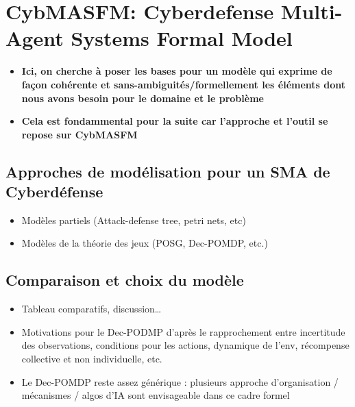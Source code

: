 \chapter{CybMASFM: Cyberdefense Multi-Agent Systems Formal Model}\label{ch:cybmasfm} %

\begin{itemize}
    \item \textbf{Ici, on cherche à poser les bases pour un modèle qui exprime de façon cohérente et sans-ambiguités/formellement les éléments dont nous avons besoin pour le domaine et le problème}
    \item \textbf{Cela est fondammental pour la suite car l'approche et l'outil se repose sur CybMASFM}
\end{itemize}

\section{Approches de modélisation pour un SMA de Cyberdéfense}
\begin{itemize}

    \item Modèles partiels (Attack-defense tree, petri nets, etc)
    \item Modèles de la théorie des jeux (POSG, Dec-POMDP, etc.)
\end{itemize}

\section{Comparaison et choix du modèle}
\begin{itemize}

    \item Tableau comparatifs, discussion…
    \item Motivations pour le Dec-PODMP d’après le rapprochement entre incertitude des observations, conditions pour les actions, dynamique de l’env, récompense collective et non individuelle, etc.
    \item Le Dec-POMDP reste assez générique : plusieurs approche d’organisation / mécanismes / algos d’IA sont envisageable dans ce cadre formel
\end{itemize}

